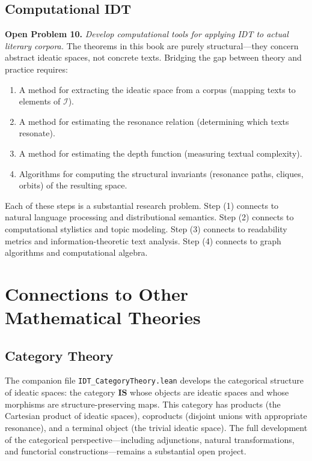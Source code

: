 \documentclass[11pt,openany]{book}
\theoremstyle{definition}
\theoremstyle{plain}
\theoremstyle{remark}
\newcommand{\IS}{\mathcal{I}}               %
\begin{document}
\subsection{Computational IDT}

\textbf{Open Problem 10.} \emph{Develop computational tools for applying IDT to actual literary corpora.} The theorems in this book are purely structural---they concern abstract ideatic spaces, not concrete texts. Bridging the gap between theory and practice requires:
\begin{enumerate}
\item A method for extracting the ideatic space from a corpus (mapping texts to elements of $\IS$).
\item A method for estimating the resonance relation (determining which texts resonate).
\item A method for estimating the depth function (measuring textual complexity).
\item Algorithms for computing the structural invariants (resonance paths, cliques, orbits) of the resulting space.
\end{enumerate}

Each of these steps is a substantial research problem. Step (1) connects to natural language processing and distributional semantics. Step (2) connects to computational stylistics and topic modeling. Step (3) connects to readability metrics and information-theoretic text analysis. Step (4) connects to graph algorithms and computational algebra.

\section{Connections to Other Mathematical Theories}

\subsection{Category Theory}

The companion file \texttt{IDT\_CategoryTheory.lean} develops the categorical structure of ideatic spaces: the category $\mathbf{IS}$ whose objects are ideatic spaces and whose morphisms are structure-preserving maps. This category has products (the Cartesian product of ideatic spaces), coproducts (disjoint unions with appropriate resonance), and a terminal object (the trivial ideatic space). The full development of the categorical perspective---including adjunctions, natural transformations, and functorial constructions---remains a substantial open project.
\end{document}
